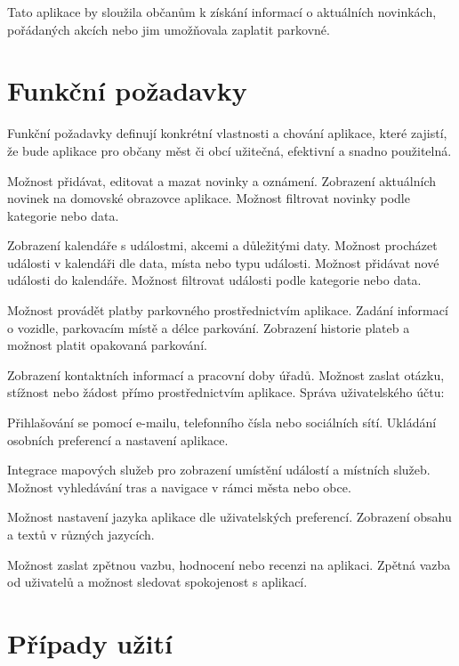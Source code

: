 Tato aplikace by sloužila občanům k získání informací o aktuálních novinkách, pořádaných akcích nebo jim umožňovala
zaplatit parkovné.

\section{Funkční požadavky}
Funkční požadavky definují konkrétní vlastnosti a chování aplikace, které zajistí, že bude aplikace pro občany měst či obcí 
užitečná, efektivní a snadno použitelná.

Možnost přidávat, editovat a mazat novinky a oznámení.
Zobrazení aktuálních novinek na domovské obrazovce aplikace.
Možnost filtrovat novinky podle kategorie nebo data.

Zobrazení kalendáře s událostmi, akcemi a důležitými daty.
Možnost procházet události v kalendáři dle data, místa nebo typu události.
Možnost přidávat nové události do kalendáře.
Možnost filtrovat události podle kategorie nebo data.

Možnost provádět platby parkovného prostřednictvím aplikace.
Zadání informací o vozidle, parkovacím místě a délce parkování.
Zobrazení historie plateb a možnost platit opakovaná parkování.

Zobrazení kontaktních informací a pracovní doby úřadů.
Možnost zaslat otázku, stížnost nebo žádost přímo prostřednictvím aplikace.
Správa uživatelského účtu:

Přihlašování se pomocí e-mailu, telefonního čísla nebo sociálních sítí.
Ukládání osobních preferencí a nastavení aplikace.

Integrace mapových služeb pro zobrazení umístění událostí a místních služeb.
Možnost vyhledávání tras a navigace v rámci města nebo obce.

Možnost nastavení jazyka aplikace dle uživatelských preferencí.
Zobrazení obsahu a textů v různých jazycích.

Možnost zaslat zpětnou vazbu, hodnocení nebo recenzi na aplikaci.
Zpětná vazba od uživatelů a možnost sledovat spokojenost s aplikací.

\section{Případy užití}

